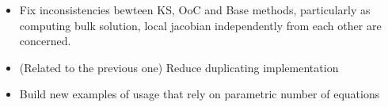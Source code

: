 \begin{todobox}
\begin{itemize}
	\item Fix inconsistencies bewteen KS, OoC and Base methods, particularly as computing bulk solution, local jacobian independently from each other are concerned. 
	\item (Related to the previous one) Reduce duplicating implementation
	\item Build new examples of usage that rely on parametric number of equations
\end{itemize}
\end{todobox}

